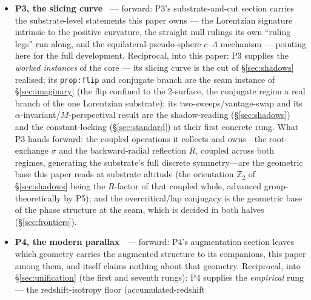 \documentclass[11pt,a4paper]{article}
\theoremstyle{definition}
\begin{document}
\begin{itemize}
metric's and reading the chart's labelling --- the first, sharpest instance of
the shadow-reading of \S\ref{sec:shadows} (a real feature of a
vantage-dependent description, built-and-real, not an artefact in the
pejorative sense). The everywhere-real continuation through the seam
(\S\ref{sec:imaginary}) is the circle's own analytic completion. Sbierski's inextendibility concerns the maximal analytic
Schwarzschild spacetime, the $\Lambda=0$ object this construction does not contain; on the substrate the
geometry runs through the locus the chart labels $r=0$, $C^\infty$ across it~\cite{JanzenCRframework}.
\item \textbf{P3, the slicing curve~\cite{JanzenSlicing}} --- forward: P3's substrate-and-cut section carries the
substrate-level statements this paper owns --- the Lorentzian signature
intrinsic to the positive curvature, the straight null rulings its own
``ruling legs'' run along, and the equilateral-pseudo-sphere $c$--$\Lambda$
mechanism --- pointing here for the full development. Reciprocal, into this
paper: P3 supplies the \emph{worked instances} of the core --- its slicing
curve is the cut of \S\ref{sec:shadows} realised; its \texttt{prop:flip} and
conjugate branch are the seam instance of \S\ref{sec:imaginary} (the flip
confined to the 2-surface, the conjugate region a real branch of the one
Lorentzian substrate); its two-sweeps/vantage-swap and its
$\alpha$-invariant/$M$-perspectival result are the shadow-reading
(\S\ref{sec:shadows}) and the constant-locking (\S\ref{sec:standard}) at
their first concrete rung. What P3 hands forward: the coupled operations it collects and owns---the root-exchange $\sigma$ and the backward-radial reflection $R$, coupled across both regimes, generating the substrate's full discrete symmetry---are the geometric base this paper reads at substrate altitude (the orientation $\mathbb{Z}_2$ of \S\ref{sec:shadows} being the $R$-factor of that coupled whole, advanced group-theoretically by P5); and the overcritical/lap
conjugacy is the geometric base of the phase structure at the seam, which is decided in both halves (\S\ref{sec:frontiers}).
\item \textbf{P4, the modern parallax~\cite{JanzenModernParallax}} --- forward: P4's augmentation section leaves which geometry
carries the augmented structure to its companions, this paper among them, and
itself claims nothing about that geometry. Reciprocal, into
\S\ref{sec:unification} (the first and seventh rungs): P4 supplies the
\emph{empirical} rung --- the redshift-isotropy floor (accumulated-redshift

\end{itemize}
\end{document}
